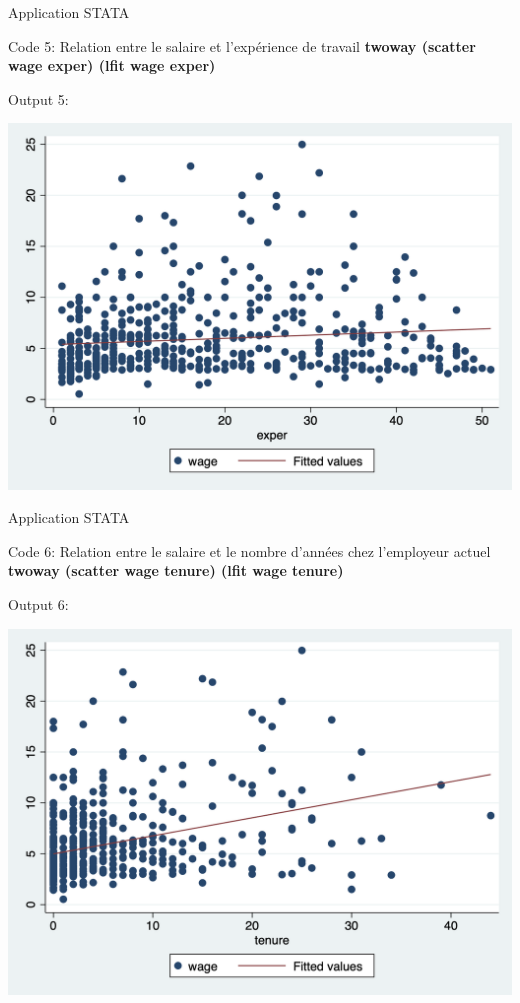 \documentclass{beamer}
\begin{document}
\begin{frame}{Application STATA}
\begin{block}{Code 5: Relation entre le salaire et l'expérience de travail}
\textbf{twoway (scatter wage exper) (lfit wage exper)}
\end{block}

\begin{block}{Output 5:}
\begin{center}
\includegraphics[scale=.3]{PLOT_2.png}
\end{center}
\end{block}
\end{frame}

\begin{frame}{Application STATA}
\begin{block}{Code 6: Relation entre le salaire et le nombre d'années chez l'employeur actuel}
\textbf{twoway (scatter wage tenure) (lfit wage tenure)}
\end{block}

\begin{block}{Output 6:}
\begin{center}
\includegraphics[scale=.3]{PLOT_3.png}
\end{center}
\end{block}
\end{frame}
\end{document}
